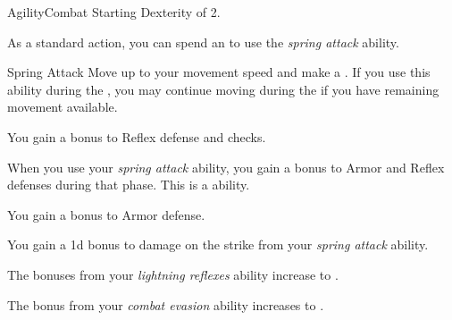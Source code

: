     \begin{feat}{Agility}{Combat}
        \featpre Starting Dexterity of 2.

         As a standard action, you can spend an  to use the \textit{spring attack} ability.
        \begin{ability}{Spring Attack}
            Move up to your movement speed and make a .
            If you use this ability during the , you may continue moving during the  if you have remaining movement available.
        \end{ability}

         You gain a  bonus to Reflex defense and  checks.

         When you use your \textit{spring attack} ability, you gain a  bonus to Armor and Reflex defenses during that phase.
        This is a  ability.

         You gain a  bonus to Armor defense.

         You gain a \plus1d bonus to damage on the strike from your \textit{spring attack} ability.

         The bonuses from your \textit{lightning reflexes} ability increase to .

         The bonus from your \textit{combat evasion} ability increases to .
    \end{feat}

